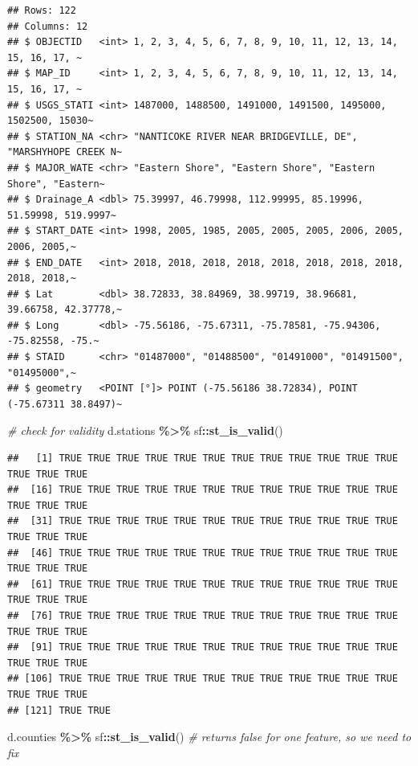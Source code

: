 \documentclass[]{article}
\newenvironment{Shaded}{\begin{snugshade}}{\end{snugshade}}
\newcommand{\CommentTok}[1]{\textcolor[rgb]{0.56,0.35,0.01}{\textit{#1}}}
\newcommand{\FunctionTok}[1]{\textcolor[rgb]{0.13,0.29,0.53}{\textbf{#1}}}
\newcommand{\NormalTok}[1]{#1}
\newcommand{\SpecialCharTok}[1]{\textcolor[rgb]{0.81,0.36,0.00}{\textbf{#1}}}
\begin{document}
\begin{verbatim}
## Rows: 122
## Columns: 12
## $ OBJECTID   <int> 1, 2, 3, 4, 5, 6, 7, 8, 9, 10, 11, 12, 13, 14, 15, 16, 17, ~
## $ MAP_ID     <int> 1, 2, 3, 4, 5, 6, 7, 8, 9, 10, 11, 12, 13, 14, 15, 16, 17, ~
## $ USGS_STATI <int> 1487000, 1488500, 1491000, 1491500, 1495000, 1502500, 15030~
## $ STATION_NA <chr> "NANTICOKE RIVER NEAR BRIDGEVILLE, DE", "MARSHYHOPE CREEK N~
## $ MAJOR_WATE <chr> "Eastern Shore", "Eastern Shore", "Eastern Shore", "Eastern~
## $ Drainage_A <dbl> 75.39997, 46.79998, 112.99995, 85.19996, 51.59998, 519.9997~
## $ START_DATE <int> 1998, 2005, 1985, 2005, 2005, 2005, 2006, 2005, 2006, 2005,~
## $ END_DATE   <int> 2018, 2018, 2018, 2018, 2018, 2018, 2018, 2018, 2018, 2018,~
## $ Lat        <dbl> 38.72833, 38.84969, 38.99719, 38.96681, 39.66758, 42.37778,~
## $ Long       <dbl> -75.56186, -75.67311, -75.78581, -75.94306, -75.82558, -75.~
## $ STAID      <chr> "01487000", "01488500", "01491000", "01491500", "01495000",~
## $ geometry   <POINT [°]> POINT (-75.56186 38.72834), POINT (-75.67311 38.8497)~
\end{verbatim}

\begin{Shaded}
\begin{Highlighting}[]
\CommentTok{\# check for validity}
\NormalTok{d.stations }\SpecialCharTok{\%\textgreater{}\%}\NormalTok{ sf}\SpecialCharTok{::}\FunctionTok{st\_is\_valid}\NormalTok{()}
\end{Highlighting}
\end{Shaded}

\begin{verbatim}
##   [1] TRUE TRUE TRUE TRUE TRUE TRUE TRUE TRUE TRUE TRUE TRUE TRUE TRUE TRUE TRUE
##  [16] TRUE TRUE TRUE TRUE TRUE TRUE TRUE TRUE TRUE TRUE TRUE TRUE TRUE TRUE TRUE
##  [31] TRUE TRUE TRUE TRUE TRUE TRUE TRUE TRUE TRUE TRUE TRUE TRUE TRUE TRUE TRUE
##  [46] TRUE TRUE TRUE TRUE TRUE TRUE TRUE TRUE TRUE TRUE TRUE TRUE TRUE TRUE TRUE
##  [61] TRUE TRUE TRUE TRUE TRUE TRUE TRUE TRUE TRUE TRUE TRUE TRUE TRUE TRUE TRUE
##  [76] TRUE TRUE TRUE TRUE TRUE TRUE TRUE TRUE TRUE TRUE TRUE TRUE TRUE TRUE TRUE
##  [91] TRUE TRUE TRUE TRUE TRUE TRUE TRUE TRUE TRUE TRUE TRUE TRUE TRUE TRUE TRUE
## [106] TRUE TRUE TRUE TRUE TRUE TRUE TRUE TRUE TRUE TRUE TRUE TRUE TRUE TRUE TRUE
## [121] TRUE TRUE
\end{verbatim}

\begin{Shaded}
\begin{Highlighting}[]
\NormalTok{d.counties }\SpecialCharTok{\%\textgreater{}\%}\NormalTok{ sf}\SpecialCharTok{::}\FunctionTok{st\_is\_valid}\NormalTok{() }\CommentTok{\# returns false for one feature, so we need to fix}
\end{Highlighting}
\end{Shaded}
\end{document}
